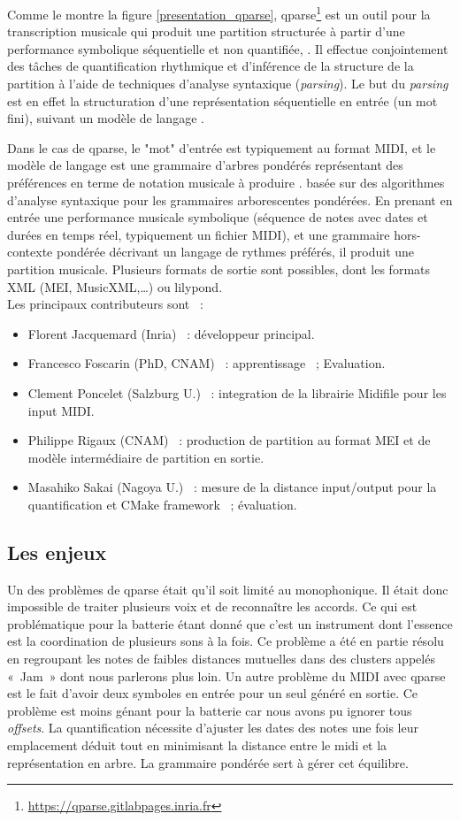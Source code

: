 Comme le montre la figure \ref{presentation_qparse}, qparse\footnote{
\url{https://qparse.gitlabpages.inria.fr}} est un outil pour la transcription
musicale qui produit une partition structurée à partir d’une performance symbolique séquentielle et non
quantifiée, . Il effectue conjointement des
tâches de quantification rhythmique et d’inférence de la structure de la
partition à l’aide de techniques d’analyse syntaxique (\textit{\textit{parsing}}). Le
but du \textit{\textit{parsing}} est en effet la structuration d’une représentation
séquentielle en entrée (un mot fini), suivant un modèle de langage
\cite{grune2007parsing}.

Dans le cas de qparse, le "mot" d’entrée est typiquement au format MIDI, et le
modèle de langage est une grammaire d’arbres pondérés représentant des
préférences en terme de notation musicale à produire \cite{droste2009handbook}.
basée sur des algorithmes d’analyse syntaxique pour les grammaires
arborescentes pondérées. En prenant en entrée une performance musicale
symbolique (séquence de notes avec dates et durées en temps réel, typiquement
un fichier MIDI), et une grammaire hors-contexte pondérée décrivant un langage
de rythmes préférés, il produit une partition musicale. Plusieurs formats de
sortie sont possibles, dont les formats XML (MEI, MusicXML,…) ou lilypond.\\

Les principaux contributeurs sont~ :
\begin{itemize}
	\item Florent Jacquemard (Inria)~ : développeur principal.
	\item Francesco Foscarin (PhD, CNAM)~ : apprentissage~ ; Evaluation.
	\item Clement Poncelet (Salzburg U.)~ : integration de la librairie Midifile
        pour les input MIDI.
	\item Philippe Rigaux (CNAM)~ : production de partition au format MEI et de
        modèle intermédiaire de partition en sortie.
	\item Masahiko Sakai (Nagoya U.)~ : mesure de la distance input/output pour
        la quantification et CMake framework~ ; évaluation.
\end{itemize}

\subsection*{Les enjeux}
Un des problèmes de qparse était qu’il soit limité au monophonique. Il était
donc impossible de traiter plusieurs voix et de reconnaître les accords. Ce qui
est problématique pour la batterie étant donné que c’est un instrument dont l’essence
est la coordination de plusieurs sons à la fois. Ce problème a été en partie résolu
en regroupant les notes de faibles distances mutuelles dans des clusters appelés
«~Jam~» dont nous parlerons plus loin.
Un autre problème du MIDI avec qparse est le fait d’avoir deux symboles en entrée
pour un seul généré en sortie. Ce problème est moins génant pour la batterie car
nous avons pu ignorer tous \textit{offsets}.
La quantification nécessite d’ajuster les dates des notes une fois leur emplacement
déduit tout en minimisant la distance entre le midi et la représentation en arbre. La grammaire pondérée sert à gérer cet équilibre.
